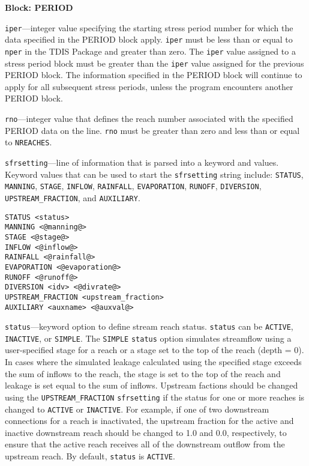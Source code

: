\item \textbf{Block: PERIOD}

\begin{description}
\item \texttt{iper}---integer value specifying the starting stress period number for which the data specified in the PERIOD block apply.  \texttt{iper} must be less than or equal to \texttt{nper} in the TDIS Package and greater than zero.  The \texttt{iper} value assigned to a stress period block must be greater than the \texttt{iper} value assigned for the previous PERIOD block.  The information specified in the PERIOD block will continue to apply for all subsequent stress periods, unless the program encounters another PERIOD block.

\item \texttt{rno}---integer value that defines the reach number associated with the specified PERIOD data on the line. \texttt{rno} must be greater than zero and less than or equal to \texttt{NREACHES}.

\item \texttt{sfrsetting}---line of information that is parsed into a keyword and values.  Keyword values that can be used to start the \texttt{sfrsetting} string include: \texttt{STATUS}, \texttt{MANNING}, \texttt{STAGE}, \texttt{INFLOW}, \texttt{RAINFALL}, \texttt{EVAPORATION}, \texttt{RUNOFF}, \texttt{DIVERSION}, \texttt{UPSTREAM\_FRACTION}, and \texttt{AUXILIARY}.

\begin{lstlisting}[style=blockdefinition]
STATUS <status>
MANNING <@manning@>
STAGE <@stage@>
INFLOW <@inflow@>
RAINFALL <@rainfall@>
EVAPORATION <@evaporation@>
RUNOFF <@runoff@>
DIVERSION <idv> <@divrate@> 
UPSTREAM_FRACTION <upstream_fraction>
AUXILIARY <auxname> <@auxval@> 
\end{lstlisting}

\item \texttt{status}---keyword option to define stream reach status.  \texttt{status} can be \texttt{ACTIVE}, \texttt{INACTIVE}, or \texttt{SIMPLE}. The \texttt{SIMPLE} \texttt{status} option simulates streamflow using a user-specified stage for a reach or a stage set to the top of the reach (depth = 0). In cases where the simulated leakage calculated using the specified stage exceeds the sum of inflows to the reach, the stage is set to the top of the reach and leakage is set equal to the sum of inflows. Upstream factions should be changed using the \texttt{UPSTREAM\_FRACTION} \texttt{sfrsetting} if the status for one or more reaches is changed to \texttt{ACTIVE} or \texttt{INACTIVE}. For example, if one of two downstream connections for a reach is inactivated, the upstream fraction for the active and inactive downstream reach should be changed to 1.0 and 0.0, respectively, to ensure that the active reach receives all of the downstream outflow from the upstream reach. By default, \texttt{status} is \texttt{ACTIVE}.


\end{description}
